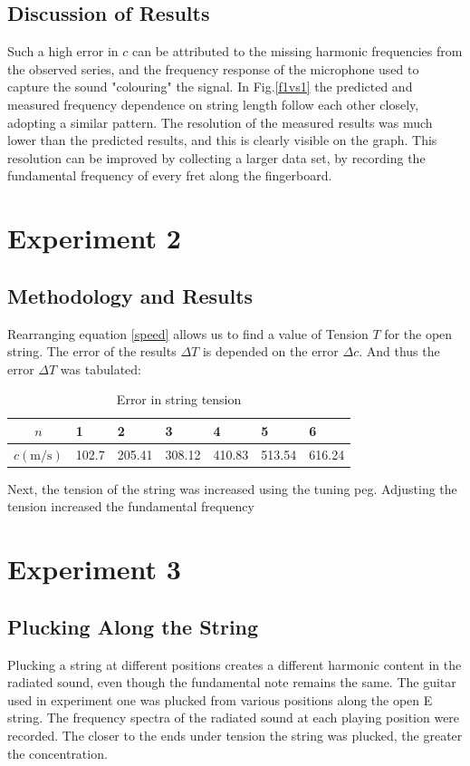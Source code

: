 \documentclass[11pt]{article}
\begin{document}
        \subsection{Discussion of Results}
            Such a high error in $c$ can be attributed to the missing harmonic frequencies from the observed series, and the frequency response of the microphone used to capture the sound "colouring" the signal.
            In Fig.\ref{f1vs1} the predicted and measured frequency dependence on string length follow each other closely, adopting a similar pattern.
            The resolution of the measured results was much lower than the predicted results, and this is clearly visible on the graph.
            This resolution can be improved by collecting a larger data set, by recording the fundamental frequency of every fret along the fingerboard.
            
    \section{Experiment 2}
        \subsection{Methodology and Results}
            Rearranging equation \ref{speed} allows us to find a value of Tension $T$ for the open string.
            The error of the results $\Delta T$ is depended on the error $\Delta c$. And thus the error $\Delta T$ was tabulated:
            \begin{table}[H]
                \centering
                \begin{tabular}{c | l l l l l l}
                    \hline  
                    $n$ & 1 & 2 & 3 & 4 & 5 & 6 \\
                    \hline
                    $c(\si{\meter\per\second})$ & 102.7 & 205.41 & 308.12 & 410.83 & 513.54 & 616.24 \\
                    \hline
                \end{tabular}
                \caption{Error in string tension}
            \end{table}
            Next, the tension of the string was increased using the tuning peg.
            Adjusting the tension increased the fundamental frequency
    \section{Experiment 3}
        \subsection{Plucking Along the String}
            Plucking a string at different positions creates a different harmonic content in the radiated sound, even though the fundamental note remains the same.
            The guitar used in experiment one was plucked from various positions along the open E string.
            The frequency spectra of the radiated sound at each playing position were recorded.
            The closer to the ends under tension the string was plucked, the greater the concentration.
\end{document}
